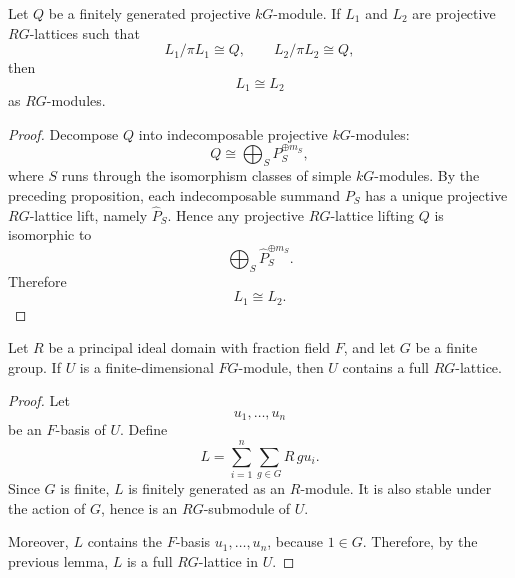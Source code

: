 \begin{corollary}
    Let \(Q\) be a finitely generated projective \(kG\)-module. If \(L_1\) and
    \(L_2\) are projective \(RG\)-lattices such that
    \[
        L_1/\pi L_1\cong Q,
        \qquad
        L_2/\pi L_2\cong Q,
    \]
    then
    \[
        L_1\cong L_2
    \]
    as \(RG\)-modules.
\end{corollary}

\begin{proof}
    Decompose \(Q\) into indecomposable projective \(kG\)-modules:
    \[
        Q\cong \bigoplus_S P_S^{\oplus m_S},
    \]
    where \(S\) runs through the isomorphism classes of simple \(kG\)-modules.
    By the preceding proposition, each indecomposable summand \(P_S\) has a unique
    projective \(RG\)-lattice lift, namely \(\widehat P_S\). Hence any projective
    \(RG\)-lattice lifting \(Q\) is isomorphic to
    \[
        \bigoplus_S \widehat P_S^{\oplus m_S}.
    \]
    Therefore
    \[
        L_1\cong L_2.
    \]
\end{proof}

\begin{corollary}
    Let \(R\) be a principal ideal domain with fraction field \(F\), and let \(G\)
    be a finite group. If \(U\) is a finite-dimensional \(FG\)-module, then \(U\)
    contains a full \(RG\)-lattice.
\end{corollary}

\begin{proof}
    Let
    \[
        u_1,\ldots,u_n
    \]
    be an \(F\)-basis of \(U\). Define
    \[
        L=\sum_{i=1}^n\sum_{g\in G} R\,g u_i.
    \]
    Since \(G\) is finite, \(L\) is finitely generated as an \(R\)-module. It is also
    stable under the action of \(G\), hence is an \(RG\)-submodule of \(U\).

    Moreover, \(L\) contains the \(F\)-basis \(u_1,\ldots,u_n\), because \(1\in G\).
    Therefore, by the previous lemma, \(L\) is a full \(RG\)-lattice in \(U\).
\end{proof}
